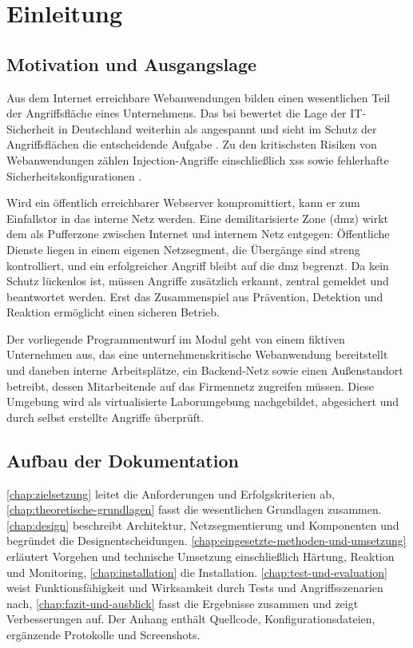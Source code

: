 \chapter{Einleitung}\label{chap:einleitung}

\section{Motivation und Ausgangslage}\label{sec:motivation-und-ausgangslage}

Aus dem Internet erreichbare Webanwendungen bilden einen wesentlichen Teil der Angriffsfläche eines Unternehmens. Das \ac{bsi} bewertet die Lage der IT-Sicherheit in Deutschland weiterhin als angespannt und sieht im Schutz der Angriffsflächen die entscheidende Aufgabe \autocite{bsi_lagebericht_2025}. Zu den kritischsten Risiken von Webanwendungen zählen Injection-Angriffe einschließlich \ac{xss} sowie fehlerhafte Sicherheitskonfigurationen \autocite{owasp_top10_2025}.

Wird ein öffentlich erreichbarer Webserver kompromittiert, kann er zum Einfallstor in das interne Netz werden. Eine demilitarisierte Zone (\acs{dmz}) wirkt dem als Pufferzone zwischen Internet und internem Netz entgegen: Öffentliche Dienste liegen in einem eigenen Netzsegment, die Übergänge sind streng kontrolliert, und ein erfolgreicher Angriff bleibt auf die \ac{dmz} begrenzt. Da kein Schutz lückenlos ist, müssen Angriffe zusätzlich erkannt, zentral gemeldet und beantwortet werden. Erst das Zusammenspiel aus Prävention, Detektion und Reaktion ermöglicht einen sicheren Betrieb.

Der vorliegende Programmentwurf im Modul  geht von einem fiktiven Unternehmen aus, das eine unternehmenskritische Webanwendung bereitstellt und daneben interne Arbeitsplätze, ein Backend-Netz sowie einen Außenstandort betreibt, dessen Mitarbeitende auf das Firmennetz zugreifen müssen. Diese Umgebung wird als virtualisierte Laborumgebung nachgebildet, abgesichert und durch selbst erstellte Angriffe überprüft.

\section{Aufbau der Dokumentation}\label{sec:aufbau-der-dokumentation}

\autoref{chap:zielsetzung} leitet die Anforderungen und Erfolgskriterien ab, \autoref{chap:theoretische-grundlagen} fasst die wesentlichen Grundlagen zusammen. \autoref{chap:design} beschreibt Architektur, Netzsegmentierung und Komponenten und begründet die Designentscheidungen. \autoref{chap:eingesetzte-methoden-und-umsetzung} erläutert Vorgehen und technische Umsetzung einschließlich Härtung, Reaktion und Monitoring, \autoref{chap:installation} die Installation. \autoref{chap:test-und-evaluation} weist Funktionsfähigkeit und Wirksamkeit durch Tests und Angriffsszenarien nach, \autoref{chap:fazit-und-ausblick} fasst die Ergebnisse zusammen und zeigt Verbesserungen auf. Der Anhang enthält Quellcode, Konfigurationsdateien, ergänzende Protokolle und Screenshots.
